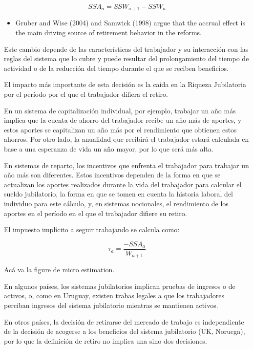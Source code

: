 \documentclass[]{article}
\providecommand{\tightlist}{%
  \setlength{\itemsep}{0pt}\setlength{\parskip}{0pt}}
\begin{document}
\[ SSA_{a} = SSW_{a+1} - SSW_{a}\]

\begin{itemize}
\tightlist
\item
  Gruber and Wise (2004) and Samwick (1998) argue that the accrual
  effect is the main driving source of retirement behavior in the
  reforms.
\end{itemize}

Este cambio depende de las características del trabajador y su
interacción con las reglas del sistema que lo cubre y puede resultar del
prolongamiento del tiempo de actividad o de la reducción del tiempo
durante el que se reciben beneficios.

El impacto más importante de esta decisión es la caída en la Riqueza
Jubilatoria por el período por el que el trabajador difiera el retiro.

En un sistema de capitalización individual, por ejemplo, trabajar un año
más implica que la cuenta de ahorro del trabajador recibe un año más de
aportes, y estos aportes se capitalizan un año más por el rendimiento
que obtienen estos ahorros. Por otro lado, la anualidad que recibirá el
trabajador estará calculada en base a una esperanza de vida un año
mayor, por lo que será más alta.

En sistemas de reparto, los incentivos que enfrenta el trabajador para
trabajar un año más son diferentes. Estos incentivos dependen de la
forma en que se actualizan los aportes realizados durante la vida del
trabajador para calcular el sueldo jubilatorio, la forma en que se tomen
en cuenta la historia laboral del individuo para este cálculo, y, en
sistemas nocionales, el rendimiento de los aportes en el período en el
que el trabajador difiere su retiro.

El impuesto implícito a seguir trabajando se calcula como:

\[ \tau_{a} = \frac{-SSA_{a}}{W_{a+1}} \]

Acá va la figure de micro estimation.

En algunos países, los sistemas jubilatorios implican pruebas de
ingresos o de activos, o, como en Uruguay, existen trabas legales a que
los trabajadores perciban ingresos del sistema jubilatorio mientras se
mantienen activos.

En otros países, la decisión de retirarse del mercado de trabajo es
independiente de la decisión de acogerse a los beneficios del sistema
jubilatorio (UK, Noruega), por lo que la definición de retiro no implica
una sino dos decisiones.
\end{document}

